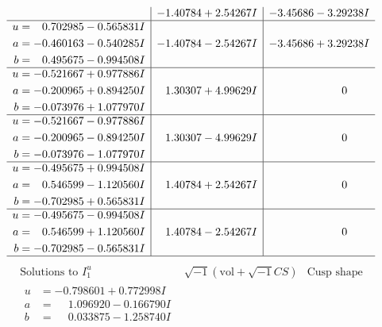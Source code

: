 \documentclass[1p]{elsarticle_modified}
\theoremstyle{definition}
\newcommand{\I}{\sqrt{-1}}
\begin{document}
$$\begin{array}{c|c|c}
 & -1.40784 + 2.54267 I & -3.45686 - 3.29238 I \\ \hline\begin{aligned}
u &= \phantom{-}0.702985 - 0.565831 I \\
a &= -0.460163 - 0.540285 I \\
b &= \phantom{-}0.495675 - 0.994508 I\end{aligned}
 & -1.40784 - 2.54267 I & -3.45686 + 3.29238 I \\ \hline\begin{aligned}
u &= -0.521667 + 0.977886 I \\
a &= -0.200965 + 0.894250 I \\
b &= -0.073976 + 1.077970 I\end{aligned}
 & \phantom{-}1.30307 + 4.99629 I & \phantom{-0.000000 } 0 \\ \hline\begin{aligned}
u &= -0.521667 - 0.977886 I \\
a &= -0.200965 - 0.894250 I \\
b &= -0.073976 - 1.077970 I\end{aligned}
 & \phantom{-}1.30307 - 4.99629 I & \phantom{-0.000000 } 0 \\ \hline\begin{aligned}
u &= -0.495675 + 0.994508 I \\
a &= \phantom{-}0.546599 - 1.120560 I \\
b &= -0.702985 + 0.565831 I\end{aligned}
 & \phantom{-}1.40784 + 2.54267 I & \phantom{-0.000000 } 0 \\ \hline\begin{aligned}
u &= -0.495675 - 0.994508 I \\
a &= \phantom{-}0.546599 + 1.120560 I \\
b &= -0.702985 - 0.565831 I\end{aligned}
 & \phantom{-}1.40784 - 2.54267 I & \phantom{-0.000000 } 0\\
 \hline 
 \end{array}$$\newpage$$\begin{array}{c|c|c}  
\text{Solutions to }I^u_{1}& \I (\text{vol} + \sqrt{-1}CS) & \text{Cusp shape}\\
 \hline 
\begin{aligned}
u &= -0.798601 + 0.772998 I \\
a &= \phantom{-}1.096920 - 0.166790 I \\
b &= \phantom{-}0.033875 - 1.258740 I\end{aligned}

\end{array}$$
\end{document}

